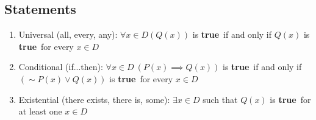 \documentclass[landscape, a4paper]{article}
\newcommand{\Or}{\vee}
\newcommand{\true}{\textbf{true}}
\newcommand{\customsection}[1]{%
    \vspace*{-16pt}%
    \section*{#1}%
    \vspace*{-5pt}%
}
\begin{document}
\small
\begin{multicols*}{4}
    \customsection{Statements}
    \begin{enumerate}[wide, labelindent=2pt]
        \item Universal (all, every, any): $\forall x\in D (Q(x))$ is \true\ if and only if $Q(x)$ is \true\ for every $x\in D$
        \item Conditional (if...then): $\forall x\in D\ (P(x) \implies Q(x))$ is \true\ if and only if $({\sim} P(x) \Or Q(x))$ is \true\ for every $x\in D$
        \item Existential (there exists, there is, some): $\exists x\in D$ such that $Q(x)$ is \true\ for at least one $x\in D$
    \end{enumerate}


\end{multicols*}
\end{document}

